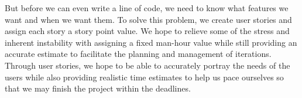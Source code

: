 But before we can even write a line of code, we need to know what features we want and when we want them. To solve this problem, we create user stories and assign each story a story point value. We hope to relieve some of the stress and inherent instability with assigning a fixed man-hour value while still providing an accurate estimate to facilitate the planning and management of iterations. Through user stories, we hope to be able to accurately portray the needs of the users while also providing realistic time estimates to help us pace ourselves so that we may finish the project within the deadlines.
